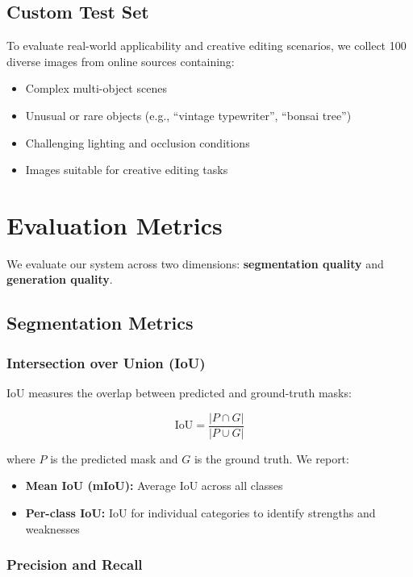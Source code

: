 \subsection{Custom Test Set}

To evaluate real-world applicability and creative editing scenarios, we collect 100 diverse images from online sources containing:
\begin{itemize}
    \item Complex multi-object scenes
    \item Unusual or rare objects (e.g., ``vintage typewriter'', ``bonsai tree'')
    \item Challenging lighting and occlusion conditions
    \item Images suitable for creative editing tasks
\end{itemize}

\section{Evaluation Metrics}

We evaluate our system across two dimensions: \textbf{segmentation quality} and \textbf{generation quality}.

\subsection{Segmentation Metrics}

\subsubsection{Intersection over Union (IoU)}

IoU measures the overlap between predicted and ground-truth masks:

\begin{equation}
\text{IoU} = \frac{|P \cap G|}{|P \cup G|}
\end{equation}

where $P$ is the predicted mask and $G$ is the ground truth. We report:
\begin{itemize}
    \item \textbf{Mean IoU (mIoU):} Average IoU across all classes
    \item \textbf{Per-class IoU:} IoU for individual categories to identify strengths and weaknesses
\end{itemize}

\subsubsection{Precision and Recall}

